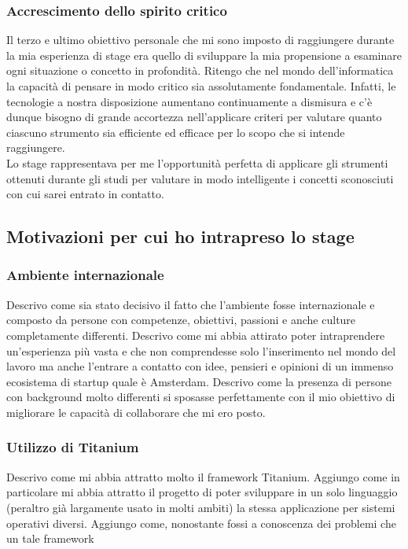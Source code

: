 			\subsubsection{Accrescimento dello spirito critico}
				Il terzo e ultimo obiettivo personale che mi sono imposto di raggiungere durante la mia esperienza di stage era
				quello di sviluppare la mia propensione a esaminare ogni situazione o concetto in profondità. Ritengo che nel mondo
				dell'informatica la capacità di pensare in modo critico sia assolutamente fondamentale. Infatti, le tecnologie a
				nostra disposizione aumentano continuamente a dismisura e c'è dunque bisogno di grande accortezza nell'applicare
				criteri per valutare quanto ciascuno strumento sia efficiente ed efficace per lo scopo che si intende raggiungere.\\
				Lo stage rappresentava per me l'opportunità perfetta di applicare gli strumenti ottenuti durante gli studi per
				valutare in modo intelligente i concetti sconosciuti con cui sarei entrato in contatto.
		\subsection{Motivazioni per cui ho intrapreso lo stage}
			\subsubsection{Ambiente internazionale}
				Descrivo come sia stato decisivo il fatto che l'ambiente fosse internazionale e composto da persone con competenze,
				obiettivi, passioni e anche culture completamente differenti. Descrivo come mi abbia attirato poter intraprendere
				un'esperienza più vasta e che non comprendesse solo l'inserimento nel mondo del lavoro ma anche l'entrare a contatto
				con idee, pensieri e opinioni di un immenso ecosistema di startup quale è Amsterdam. Descrivo come la presenza di
				persone con background molto differenti si sposasse perfettamente con il mio obiettivo di migliorare le capacità di
				collaborare che mi ero posto.
			\subsubsection{Utilizzo di Titanium}
				Descrivo come mi abbia attratto molto il framework Titanium. Aggiungo come in particolare mi abbia attratto il
				progetto di poter sviluppare in un solo linguaggio (peraltro già largamente usato in molti ambiti) la stessa
				applicazione per sistemi operativi diversi. Aggiungo come, nonostante fossi a conoscenza dei problemi che un tale
				framework 
